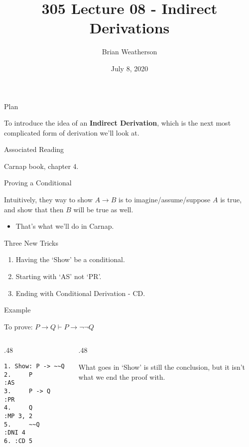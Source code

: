 \documentclass[
  ignorenonframetext,
]{beamer}
\title{305 Lecture 08 - Indirect Derivations}
\author{Brian Weatherson}
\date{July 8, 2020}
\providecommand{\tightlist}{%
  \setlength{\itemsep}{0pt}\setlength{\parskip}{0pt}}
\renewcommand{\,}{\text{, }}
\def\begincols{\begin{columns}}
\def\begincol{\begin{column}}
\def\endcol{\end{column}}
\def\endcols{\end{columns}}
\begin{document}
\frame{\titlepage}

\begin{frame}{Plan}
\protect\hypertarget{plan}{}

To introduce the idea of an \textbf{Indirect Derivation}, which is the
next most complicated form of derivation we'll look at.

\end{frame}

\begin{frame}{Associated Reading}
\protect\hypertarget{associated-reading}{}

Carnap book, chapter 4.

\end{frame}

\begin{frame}{Proving a Conditional}
\protect\hypertarget{proving-a-conditional}{}

Intuitively, they way to show \(A \rightarrow B\) is to
imagine/assume/suppose \(A\) is true, and show that then \(B\) will be
true as well.

\begin{itemize}
\tightlist
\item
  That's what we'll do in Carnap.
\end{itemize}

\end{frame}

\begin{frame}{Three New Tricks}
\protect\hypertarget{three-new-tricks}{}

\begin{enumerate}
\tightlist
\item
  Having the `Show' be a conditional.
\item
  Starting with `AS' not `PR'.
\item
  Ending with Conditional Derivation - CD.
\end{enumerate}

\end{frame}

\begin{frame}[fragile]{Example}
\protect\hypertarget{example}{}

To prove: \(P \rightarrow Q \vdash P \rightarrow \neg \neg Q\)

\bigskip

\begincols
\begincol{.48\textwidth}

\begin{verbatim}
1. Show: P -> ~~Q
2.     P          :AS
3.     P -> Q     :PR
4.     Q          :MP 3, 2
5.     ~~Q        :DNI 4
6. :CD 5
\end{verbatim}

\endcol
\begincol{.48\textwidth}

What goes in `Show' is still the conclusion, but it isn't what we end
the proof with.

\endcol
\endcols

\end{frame}
\end{document}
